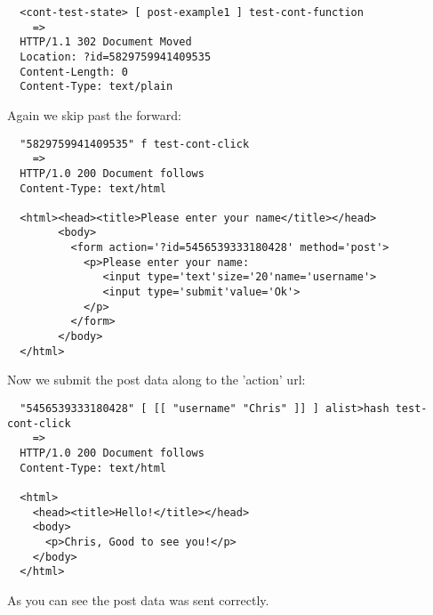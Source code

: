 \begin{verbatim}
  <cont-test-state> [ post-example1 ] test-cont-function
    =>
  HTTP/1.1 302 Document Moved
  Location: ?id=5829759941409535
  Content-Length: 0
  Content-Type: text/plain
\end{verbatim}

Again we skip past the forward:

\begin{verbatim}
  "5829759941409535" f test-cont-click
    =>
  HTTP/1.0 200 Document follows
  Content-Type: text/html

  <html><head><title>Please enter your name</title></head>
        <body>
          <form action='?id=5456539333180428' method='post'>
            <p>Please enter your name:
               <input type='text'size='20'name='username'>
               <input type='submit'value='Ok'>
            </p>
          </form> 
        </body>
  </html>
\end{verbatim}

Now we submit the post data along to the 'action' url:

\begin{verbatim}
  "5456539333180428" [ [[ "username" "Chris" ]] ] alist>hash test-cont-click
    =>
  HTTP/1.0 200 Document follows
  Content-Type: text/html

  <html>
    <head><title>Hello!</title></head>
    <body>
      <p>Chris, Good to see you!</p>
    </body>
  </html>
\end{verbatim}

As you can see the post data was sent correctly.
